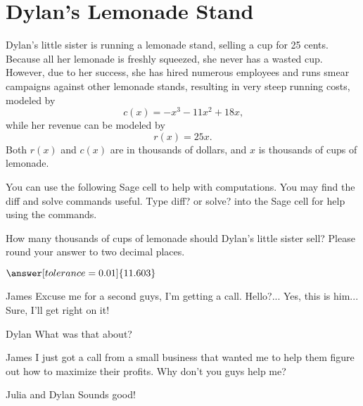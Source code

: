 \documentclass{ximera}
\begin{document}
\section{Dylan's Lemonade Stand}
Dylan's little sister is running a lemonade stand, selling a cup for 25 cents. Because all her lemonade is freshly squeezed, she never has a wasted cup. However, due to her success, she has hired numerous employees and runs smear campaigns against other lemonade stands, resulting in very steep running costs, modeled by $$c(x) = -x^3-11x^2+18x\text{,}$$ while her revenue can be modeled by $$r(x) = 25x\text{.}$$ Both $r(x)$ and $c(x)$ are in thousands of dollars, and $x$ is thousands of cups of lemonade.
\begin{question}

You can use the following Sage cell to help with computations. You may find the diff and solve commands useful. Type diff? or solve? into the Sage cell for help using the commands.
\begin{onlineOnly}
\begin{sageCell}

\end{sageCell}
\end{onlineOnly}

How many thousands of cups of lemonade should Dylan's little sister sell? Please round your answer to two decimal places.

$\answer[tolerance=0.01]{11.603}$
\end{question}
\begin{dialogue}
\item[James] Excuse me for a second guys, I'm getting a call. Hello?... Yes, this is him... Sure, I'll get right on it!
\item[Dylan] What was that about?
\item[James] I just got a call from a small business that wanted me to help them figure out how to maximize their profits. Why don't you guys help me?
\item[Julia and Dylan] Sounds good!
\end{dialogue}
\end{document}
